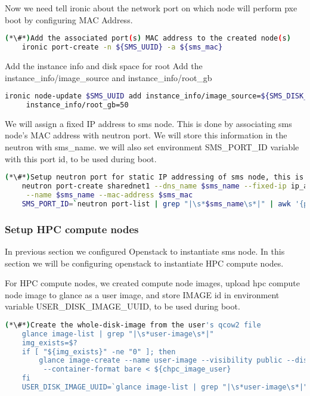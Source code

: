 Now we need tell ironic about the network port on which node will perform pxe boot by configuring MAC Address. 

	\begin{lstlisting}[language=bash,keywords={}]
    (*\#*)Add the associated port(s) MAC address to the created node(s)
    ironic port-create -n ${SMS_UUID} -a ${sms_mac}
	\end{lstlisting}

Add the instance info and disk space for root 
Add the instance\_info/image\_source and instance\_info/root\_gb
    
    \begin{lstlisting}[language=bash,keywords={}]
    ironic node-update $SMS_UUID add instance_info/image_source=${SMS_DISK_IMAGE_UUID} \
     instance_info/root_gb=50
	\end{lstlisting}


We will assign a fixed IP address to sms node. This is done by associating sms node’s MAC address with neutron port. We will store this information in the neutron with sms\_name. we will also set environment SMS\_PORT\_ID variable with this port id, to be used during boot.
    
    \begin{lstlisting}[language=bash,keywords={}]
    (*\#*)Setup neutron port for static IP addressing of sms node, this is an optional part
    neutron port-create sharednet1 --dns_name $sms_name --fixed-ip ip_address=$sms_ip \
     --name $sms_name --mac-address $sms_mac
    SMS_PORT_ID=`neutron port-list | grep "|\s*$sms_name\s*|" | awk '{print $2}'`
	\end{lstlisting}


\subsubsection{Setup HPC compute nodes}

In previous section we configured Openstack to instantiate sms node. In this section we will be configuring openstack to instantiate HPC compute nodes.

For HPC compute nodes, we created compute node images, upload hpc compute node image to glance as a user image, and store IMAGE id in environment variable USER\_DISK\_IMAGE\_UUID, to be used during boot.

\begin{lstlisting}[language=bash,keywords={}]
(*\#*)Create the whole-disk-image from the user's qcow2 file
    glance image-list | grep "|\s*user-image\s*|"
    img_exists=$?
    if [ "${img_exists}" -ne "0" ]; then
        glance image-create --name user-image --visibility public --disk-format qcow2 \
         --container-format bare < ${chpc_image_user}
    fi
    USER_DISK_IMAGE_UUID=`glance image-list | grep "|\s*user-image\s*|" | awk '{print $2}'`
\end{lstlisting}


